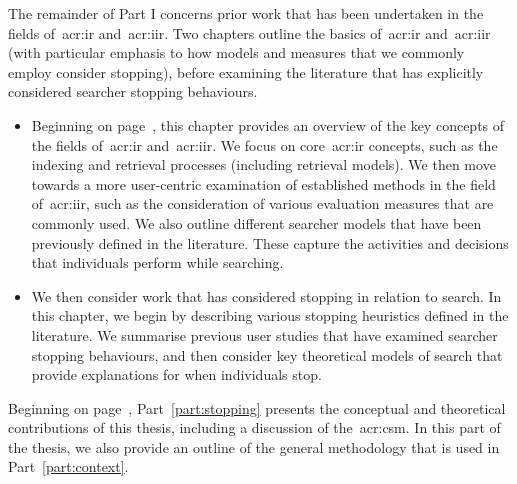 \noindent
{}
The remainder of Part I concerns prior work that has been undertaken in the fields of~\gls{acr:ir} and~\gls{acr:iir}. Two chapters outline the basics of~\gls{acr:ir} and~\gls{acr:iir} (with particular emphasis to how models and measures that we commonly employ consider stopping), before examining the literature that has explicitly considered searcher stopping behaviours.

\begin{itemize}
    \item[]{} Beginning on page~\pageref{chap:ir_background}, this chapter provides an overview of the key concepts of the fields of~\gls{acr:ir} and~\gls{acr:iir}. We focus on core~\gls{acr:ir} concepts, such as the indexing and retrieval processes (including retrieval models). We then move towards a more user-centric examination of established methods in the field of~\gls{acr:iir}, such as the consideration of various evaluation measures that are commonly used. We also outline different searcher models that have been previously defined in the literature. These capture the activities and decisions that individuals perform while searching.
    
    \item[]{} We then consider work that has considered stopping in relation to search. In this chapter, we begin by describing various stopping heuristics defined in the literature. We summarise previous user studies that have examined searcher stopping behaviours, and then consider key theoretical models of search that provide explanations for when individuals stop.
\end{itemize}

\noindent
{} Beginning on page~\pageref{part:stopping}, Part~\ref{part:stopping} presents the conceptual and theoretical contributions of this thesis, including a discussion of the~\gls{acr:csm}. In this part of the thesis, we also provide an outline of the general methodology that is used in Part~\ref{part:context}.

